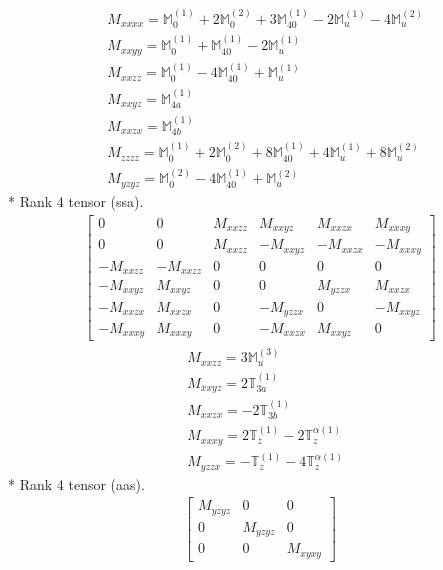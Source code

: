\documentclass[fleqn,8pt,landscape]{jsarticle}
\begin{document}
\begin{align*}
& M_{xxxx} = \mathbb{M}_{0}^{(1)} + 2 \mathbb{M}_{0}^{(2)} + 3 \mathbb{M}_{40}^{(1)} - 2 \mathbb{M}_{u}^{(1)} - 4 \mathbb{M}_{u}^{(2)} \\
& M_{xxyy} = \mathbb{M}_{0}^{(1)} + \mathbb{M}_{40}^{(1)} - 2 \mathbb{M}_{u}^{(1)} \\
& M_{xxzz} = \mathbb{M}_{0}^{(1)} - 4 \mathbb{M}_{40}^{(1)} + \mathbb{M}_{u}^{(1)} \\
& M_{xxyz} = \mathbb{M}_{4a}^{(1)} \\
& M_{xxzx} = \mathbb{M}_{4b}^{(1)} \\
& M_{zzzz} = \mathbb{M}_{0}^{(1)} + 2 \mathbb{M}_{0}^{(2)} + 8 \mathbb{M}_{40}^{(1)} + 4 \mathbb{M}_{u}^{(1)} + 8 \mathbb{M}_{u}^{(2)} \\
& M_{yzyz} = \mathbb{M}_{0}^{(2)} - 4 \mathbb{M}_{40}^{(1)} + \mathbb{M}_{u}^{(2)}
\end{align*}
* Rank 4 tensor (ssa).
\begin{align*}
\begin{bmatrix} 0 & 0 & M_{xxzz} & M_{xxyz} & M_{xxzx} & M_{xxxy} \\ 0 & 0 & M_{xxzz} & - M_{xxyz} & - M_{xxzx} & - M_{xxxy} \\ - M_{xxzz} & - M_{xxzz} & 0 & 0 & 0 & 0 \\ - M_{xxyz} & M_{xxyz} & 0 & 0 & M_{yzzx} & M_{xxzx} \\ - M_{xxzx} & M_{xxzx} & 0 & - M_{yzzx} & 0 & - M_{xxyz} \\ - M_{xxxy} & M_{xxxy} & 0 & - M_{xxzx} & M_{xxyz} & 0 \end{bmatrix}
\end{align*}
\begin{align*}
& M_{xxzz} = 3 \mathbb{M}_{u}^{(3)} \\
& M_{xxyz} = 2 \mathbb{T}_{3a}^{(1)} \\
& M_{xxzx} = - 2 \mathbb{T}_{3b}^{(1)} \\
& M_{xxxy} = 2 \mathbb{T}_{z}^{(1)} - 2 \mathbb{T}_{z}^{\alpha(1)} \\
& M_{yzzx} = - \mathbb{T}_{z}^{(1)} - 4 \mathbb{T}_{z}^{\alpha(1)}
\end{align*}
* Rank 4 tensor (aas).
\begin{align*}
\begin{bmatrix} M_{yzyz} & 0 & 0 \\ 0 & M_{yzyz} & 0 \\ 0 & 0 & M_{xyxy} \end{bmatrix}
\end{align*}
\end{document}
